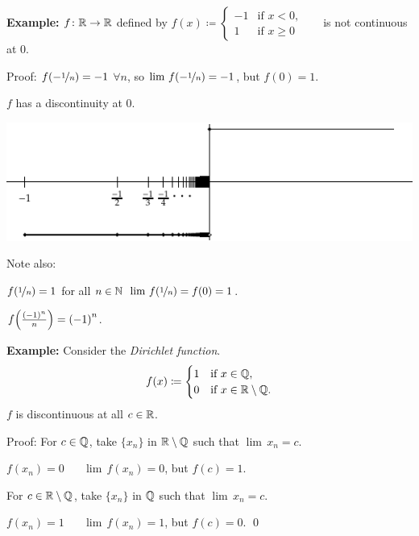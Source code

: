 \documentclass[10pt,aspectratio=169]{beamer}
\begin{document}
\begin{frame}

\textbf{Example:}
$f \colon {\mathbb{R}} \to {\mathbb{R}}$ defined by
$f(x) \coloneqq 
\begin{cases}
-1 & \text{if } x < 0, \\
1 & \text{if } x \geq 0
\end{cases}$
~~ is not continuous at 0.

\pause
\medskip

Proof: $f(-\nicefrac{1}{n}) = -1$ $\forall n$, so
$\lim\, f(-\nicefrac{1}{n}) = -1$, but $f(0) = 1$.

\pause
\thus \quad $f$ has a discontinuity at $0$.

\pause
\medskip

\begin{center}
\includegraphics{../figures/jumpdiscont}
\end{center}

\pause
\medskip

Note also:

\medskip

$f(\nicefrac{1}{n}) = 1$ for all $n \in {\mathbb{N}}$ \wthus $\lim \, f(\nicefrac{1}{n}) = f(0) = 1$.

\pause
\medskip

$f\Bigl(\frac{{(-1)}^n}{n}\Bigr) = {(-1)}^n$.
\end{frame}

\begin{frame}

\textbf{Example:}
Consider the \emph{Dirichlet function}.
\begin{equation*}
f(x) \coloneqq
\begin{cases}
1 & \text{if } x \in {\mathbb{Q}} , \\
0 & \text{if } x \in {\mathbb{R}} \setminus {\mathbb{Q}} .
\end{cases}
\end{equation*}
\pause
$f$ is discontinuous at all $c \in {\mathbb{R}}$.

\pause
\medskip

Proof:
For $c \in {\mathbb{Q}}$, take $\{ x_n \}$ in ${\mathbb{R}} \setminus {\mathbb{Q}}$ such that $\lim\, x_n = c$.

\pause
$f(x_n) = 0$ ~\thus~ $\lim\, f(x_n) = 0$,
\quad but $f(c) = 1$.

\pause
\medskip

For $c \in {\mathbb{R}} \setminus {\mathbb{Q}}$, take $\{ x_n \}$ in ${\mathbb{Q}}$ such that $\lim\, x_n = c$.

\pause
$f(x_n) = 1$ ~\thus~ $\lim\, f(x_n) = 1$,
\quad but $f(c) = 0$.
\qed

\end{frame}
\end{document}
